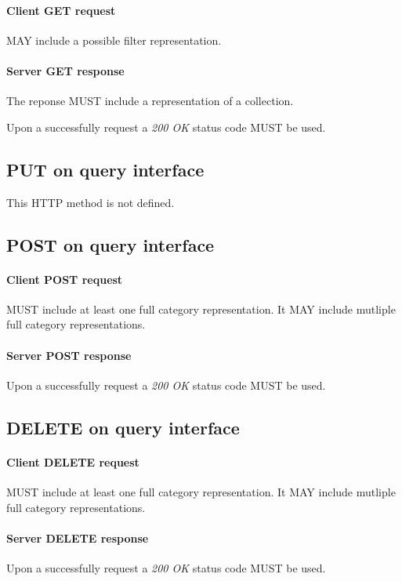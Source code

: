 \documentclass[10pt,a4paper]{article}
\begin{document}
\paragraph{Client GET request}
MAY include a possible filter representation.

\paragraph{Server GET response}
The reponse MUST include a representation of a collection.

Upon a successfully request a \emph{200 OK} status code MUST be used.

\subsection{PUT on query interface}

This HTTP method is not defined.

\subsection{POST on query interface}

\paragraph{Client POST request}
MUST include at least one full category representation. It MAY include mutliple full category representations.

\paragraph{Server POST response}
Upon a successfully request a \emph{200 OK} status code MUST be used.

\subsection{DELETE on query interface}

\paragraph{Client DELETE request}
MUST include at least one full category representation. It MAY include mutliple full category representations.

\paragraph{Server DELETE response}
Upon a successfully request a \emph{200 OK} status code MUST be used.
\end{document}
